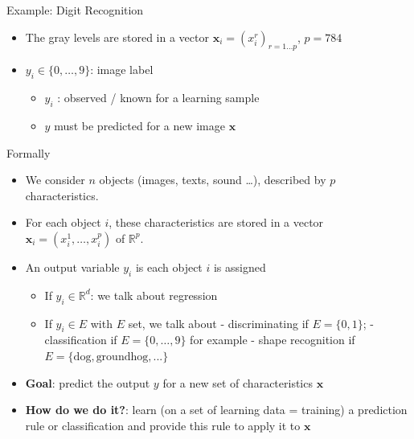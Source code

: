 \documentclass[ignorenonframetext,]{beamer}
\providecommand{\tightlist}{%
  \setlength{\itemsep}{0pt}\setlength{\parskip}{0pt}}
\begin{document}
\begin{frame}{Example: Digit Recognition}
\protect\hypertarget{example-digit-recognition-2}{}

\begin{itemize}
\item
  The gray levels are stored in a vector
  \(\mathbf{x}_i = (x_i^r)_{r = 1 \dots p}\), \(p = 784\)
\item
  \(y_i \in \{0, \dots, 9\}\): image label

  \begin{itemize}
  \tightlist
  \item
    \(y_i\) : observed / known for a learning sample
  \item
    \(y\) must be predicted for a new image \(\mathbf{x}\)
  \end{itemize}
\end{itemize}

\end{frame}

\begin{frame}{Formally}
\protect\hypertarget{formally}{}

\begin{itemize}
\item
  We consider \(n\) objects (images, texts, sound \ldots{}), described
  by \(p\) characteristics.
\item
  For each object \(i\), these characteristics are stored in a vector
  \(\mathbf{x}_i = (x_i^1, \dots, x_i^p)\) of \(\mathbb{R}^p\).
\item
  An output variable \(y_i\) is each object \(i\) is assigned

  \begin{itemize}
  \tightlist
  \item
    If \(y_i \in \mathbb{R}^d\): we talk about regression
  \item
    If \(y_i \in E\) with \(E\) set, we talk about - discriminating if
    \(E = \{0,1 \}\); - classification if \(E = \{0, \dots, 9\}\) for
    example - shape recognition if
    \(E = \{\text {dog}, \text {groundhog}, ... \}\)
  \end{itemize}
\item
  \textbf {Goal}: predict the output \(y\) for a new set of
  characteristics \(\mathbf{x}\)
\item
  \textbf{How do we do it?}: learn (on a set of learning data =
  training) a prediction rule or classification and provide this rule to
  apply it to \(\mathbf{x}\)
\end{itemize}

\end{frame}
\end{document}
